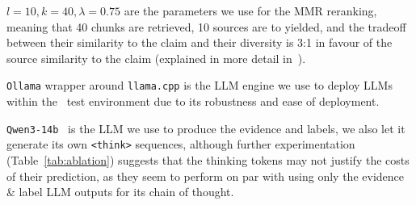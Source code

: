 $l=10, k=40, \lambda=0.75$ are the parameters we use for the MMR reranking, meaning that 40 chunks are retrieved, 10 sources are to yielded, and the tradeoff between their similarity to the claim and their diversity is 3:1 in favour of the source similarity to the claim (explained in more detail in~\citealt{ullrich-etal-2024-aic}). 

\texttt{Ollama} wrapper around \texttt{llama.cpp} is the LLM engine we use to deploy LLMs within the \averitec~test environment due to its robustness and ease of deployment.

\texttt{Qwen3-14b}~\cite{yang2025qwen3technicalreport} is the LLM we use to produce the evidence and labels, we also let it generate its own \texttt{<think>} sequences, although further experimentation (Table~\ref{tab:ablation}) suggests that the thinking tokens may not justify the costs of their prediction, as they seem to perform on par with using only the evidence \& label LLM outputs for its chain of thought.
